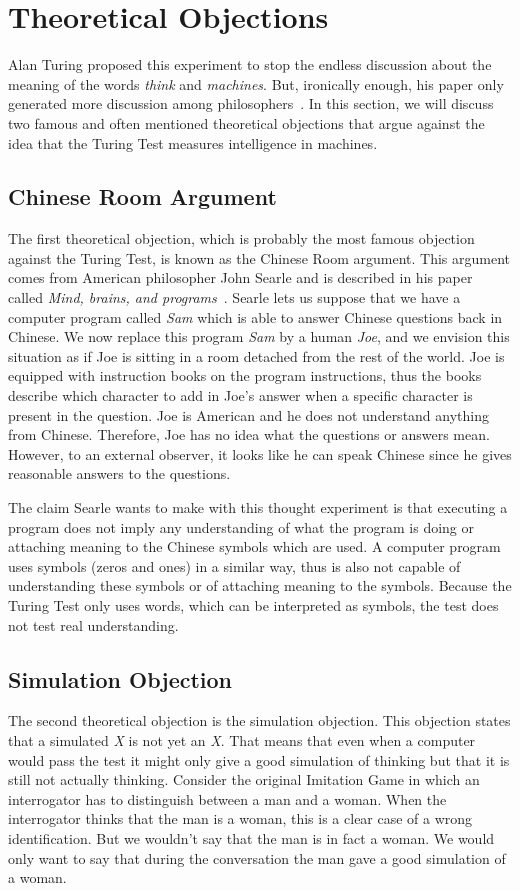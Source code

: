 \section{Theoretical Objections}

Alan Turing proposed this experiment to stop the endless discussion about the meaning of the words \textit{think} and \textit{machines}. But, ironically enough, his paper only generated more discussion among philosophers~\cite{dennett2004can}. In this section, we will discuss two famous and often mentioned theoretical objections that argue against the idea that the Turing Test measures intelligence in machines.

\subsection{Chinese Room Argument}
The first theoretical objection, which is probably the most famous objection against the Turing Test, is known as the Chinese Room argument. This argument comes from American philosopher John Searle and is described in his paper called \textit{Mind, brains, and programs}~\cite{searle1980minds}. Searle lets us suppose that we have a computer program called \textit{Sam} which is able to answer Chinese questions back in Chinese. We now replace this program \textit{Sam} by a human \textit{Joe}, and we envision this situation as if Joe is sitting in a room detached from the rest of the world. Joe is equipped with instruction books on the program instructions, thus the books describe which character to add in Joe's answer when a specific character is present in the question. Joe is American and he does not understand anything from Chinese. Therefore, Joe has no idea what the questions or answers mean. However, to an external observer, it looks like he can speak Chinese since he gives reasonable answers to the questions.

The claim Searle wants to make with this thought experiment is that executing a program does not imply any understanding of what the program is doing or attaching meaning to the Chinese symbols which are used. A computer program uses symbols (zeros and ones) in a similar way, thus is also not capable of understanding these symbols or of attaching meaning to the symbols. Because the Turing Test only uses words, which can be interpreted as symbols, the test does not test real understanding.


\subsection{Simulation Objection}
The second theoretical objection is the simulation objection. This objection states that a simulated \textit{X} is not yet an \textit{X}. That means that even when a computer would pass the test it might only give a good simulation of thinking but that it is still not actually thinking. Consider the original Imitation Game in which an interrogator has to distinguish between a man and a woman. When the interrogator thinks that the man is a woman, this is a clear case of a wrong identification. But we wouldn't say that the man is in fact a woman. We would only want to say that during the conversation the man gave a good simulation of a woman.

